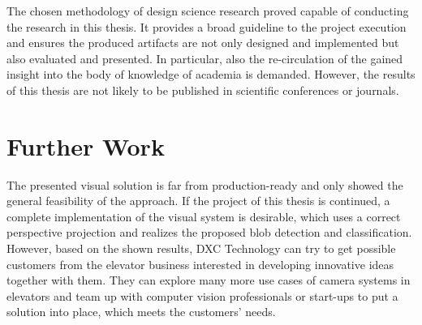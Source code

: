 The chosen methodology of design science research proved capable of 
conducting the research in this thesis.
It provides a broad guideline to the project execution 
and ensures the produced artifacts are not only designed and implemented but also evaluated and presented.
In particular, also the re-circulation of the gained insight into the body of knowledge of academia is demanded.
However, the results of this thesis are not likely to be published in scientific conferences or journals.

\section{Further Work}

The presented visual solution is far from production-ready and only showed the general feasibility of the approach.
If the project of this thesis is continued, a complete implementation of the visual system is desirable, which uses a correct perspective projection and realizes the proposed blob detection and classification.
However, based on the shown results, DXC Technology can try to get possible customers from the elevator business interested in developing innovative ideas together with them.
They can explore many more use cases of camera systems in elevators and team up with computer vision professionals or start-ups to put a solution into place, which meets the customers' needs.
